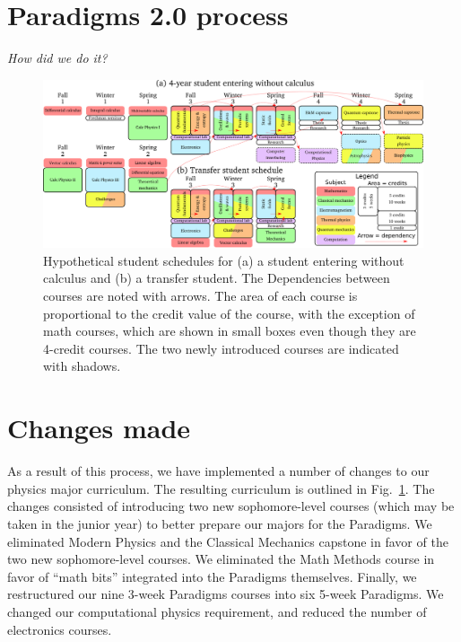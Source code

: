 \documentclass[english,aps,pra,reprint,noshowpacs,superscriptaddress]{revtex4-1}
\begin{document}
\section{Paradigms 2.0 process}
\emph{How did we do it?}

\newcommand\mathcourse[2]{\emph{#1}}
\newcommand\noted[2]{\textbf{#1} (#2)}
\newcommand\paradigm[1]{{\sc #1} (3)}
\newcommand\capstone[1]{#1 (3)}
\newcommand\onecredit[1]{#1 (1)}
\newcommand\threecredit[1]{#1 (3)}
\newcommand\fourcredit[1]{#1 (4)}

\begin{figure}
\includegraphics[width=\textwidth]{schedule}
\caption{Hypothetical student schedules for (a) a student entering
  without calculus and (b) a transfer student.  The Dependencies
  between courses are noted with arrows.  The area of each course is
  proportional to the credit value of the course, with the exception
  of math courses, which are shown in small boxes even though they are
  4-credit courses.  The two newly introduced courses are indicated
  with shadows.\label{fig:schedule}}
\end{figure}

\section{Changes made}
As a result of this process, we have implemented a number of changes
to our physics major curriculum.  The resulting curriculum is outlined
in Fig.~\ref{fig:schedule}.  The changes consisted of introducing two
new sophomore-level courses (which may be taken in the junior year) to
better prepare our majors for the Paradigms.  We eliminated Modern
Physics and the Classical Mechanics capstone in favor of the two new
sophomore-level courses.  We eliminated the Math Methods course in
favor of ``math bits'' integrated into the Paradigms themselves.
Finally, we restructured our nine 3-week Paradigms courses into six
5-week Paradigms.  We changed our computational physics requirement,
and reduced the number of electronics courses.
\end{document}
